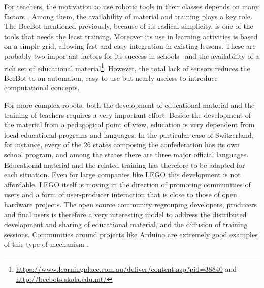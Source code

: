 \documentclass[letterpaper, 10 pt, conference]{ieeeconf}  %
\begin{document}
For teachers, the motivation to use robotic tools in their classes depends on many factors \cite{chevalier2016}.
Among them, the availability of material and training plays a key role.
The BeeBot mentioned previously, because of its radical simplicity, is one of the tools that needs the least training. 
Moreover its use in learning activities is based on a simple grid, allowing fast and easy integration in existing lessons.
These are probably two important factors for its success in schools~\cite{2008highfield,2008demichele} and the availability of a rich set of educational material\footnote{\url{https://www.learningplace.com.au/deliver/content.asp?pid=38840} and \\ \url{http://beebots.skola.edu.mt/}}.
However, the total lack of sensors reduces the BeeBot to an automaton, easy to use but nearly useless to introduce computational concepts.

For more complex robots, both the development of educational material and the training of teachers requires a very important effort. 
Beside the development of the material from a pedagogical point of view, education is very dependent from local educational programs and languages. 
In the particular case of Switzerland, for instance, every of the 26 states composing the confederation has its own school program, and among the states there are three major official languages. 
Educational material and the related training has therefore to be adapted for each situation.
Even for large companies like LEGO this development is not affordable. 
LEGO itself is moving in the direction of promoting communities of users \cite{Hienerth2014} and a form of user-producer interaction that is close to those of open hardware projects.
The open source community regrouping developers, producers and final users is therefore a very interesting model to address the distributed development and sharing of educational material, and the diffusion of training sessions.
Communities around projects like Arduino are extremely good examples of this type of mechanism \cite{Jamieson2010}.

\end{document}
